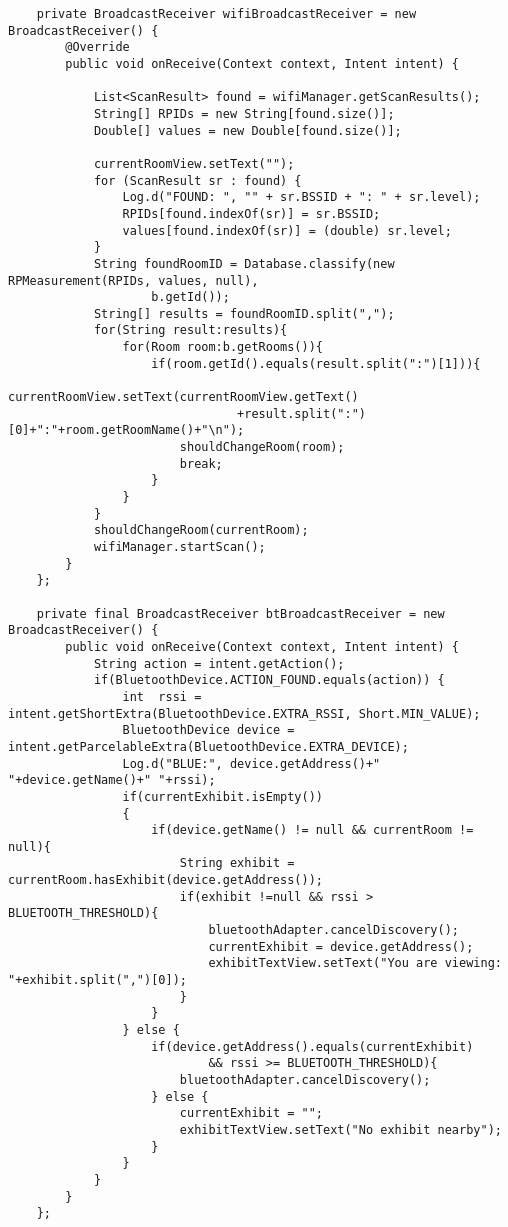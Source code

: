 \begin{lstlisting}
    private BroadcastReceiver wifiBroadcastReceiver = new BroadcastReceiver() {
        @Override
        public void onReceive(Context context, Intent intent) {

            List<ScanResult> found = wifiManager.getScanResults();
            String[] RPIDs = new String[found.size()];
            Double[] values = new Double[found.size()];

            currentRoomView.setText("");
            for (ScanResult sr : found) {
                Log.d("FOUND: ", "" + sr.BSSID + ": " + sr.level);
                RPIDs[found.indexOf(sr)] = sr.BSSID;
                values[found.indexOf(sr)] = (double) sr.level;
            }
            String foundRoomID = Database.classify(new RPMeasurement(RPIDs, values, null),
                    b.getId());
            String[] results = foundRoomID.split(",");
            for(String result:results){
                for(Room room:b.getRooms()){
                    if(room.getId().equals(result.split(":")[1])){
                        currentRoomView.setText(currentRoomView.getText()
                                +result.split(":")[0]+":"+room.getRoomName()+"\n");
                        shouldChangeRoom(room);
                        break;
                    }
                }
            }
            shouldChangeRoom(currentRoom);
            wifiManager.startScan();
        }
    };

    private final BroadcastReceiver btBroadcastReceiver = new BroadcastReceiver() {
        public void onReceive(Context context, Intent intent) {
            String action = intent.getAction();
            if(BluetoothDevice.ACTION_FOUND.equals(action)) {
                int  rssi = intent.getShortExtra(BluetoothDevice.EXTRA_RSSI, Short.MIN_VALUE);
                BluetoothDevice device = intent.getParcelableExtra(BluetoothDevice.EXTRA_DEVICE);
                Log.d("BLUE:", device.getAddress()+" "+device.getName()+" "+rssi);
                if(currentExhibit.isEmpty())
                {
                    if(device.getName() != null && currentRoom != null){
                        String exhibit = currentRoom.hasExhibit(device.getAddress());
                        if(exhibit !=null && rssi > BLUETOOTH_THRESHOLD){
                            bluetoothAdapter.cancelDiscovery();
                            currentExhibit = device.getAddress();
                            exhibitTextView.setText("You are viewing: "+exhibit.split(",")[0]);
                        }
                    }
                } else {
                    if(device.getAddress().equals(currentExhibit)
                            && rssi >= BLUETOOTH_THRESHOLD){
                        bluetoothAdapter.cancelDiscovery();
                    } else {
                        currentExhibit = "";
                        exhibitTextView.setText("No exhibit nearby");
                    }
                }
            }
        }
    };


\end{lstlisting}
